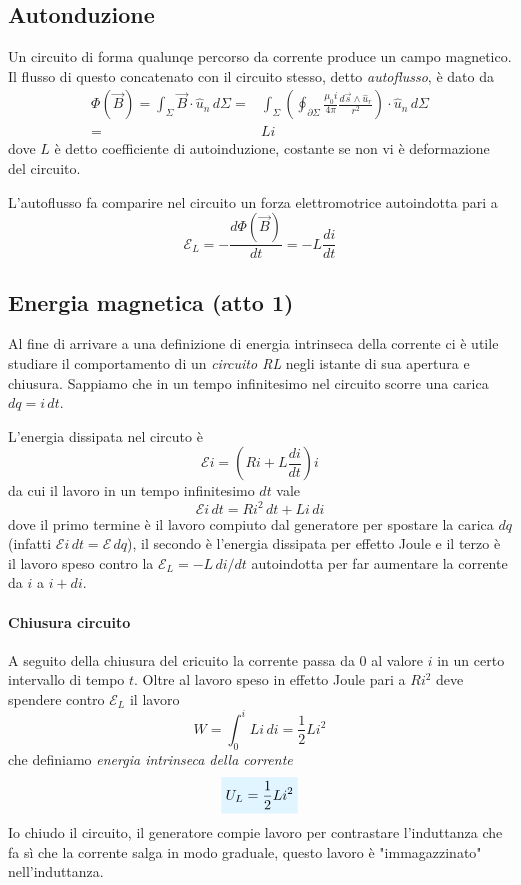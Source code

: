 \documentclass[x11names]{report}
\newcommand{\viola}[1]{%
	\colorbox{myblue}{$\displaystyle #1$}
}
\begin{document}
\subsection{Autonduzione}
Un circuito di forma qualunqe percorso da corrente produce un campo magnetico. Il flusso di questo concatenato con il circuito stesso, detto \textit{autoflusso}, è dato da 
\begin{align*}
	\Phi(\vec{B}) = \int_\Sigma \vec{B}\cdot \hat{u}_n \, d\Sigma =& \int_\Sigma \left(\oint_{\partial\Sigma} \frac{\mu_0 i}{4\pi}\frac{d\vec{s}\wedge\hat{u}_r}{r^2}\right) \cdot \hat{u}_n \, d\Sigma \\
	=& Li
\end{align*}
dove \(L\) è detto coefficiente di autoinduzione, costante se non vi è deformazione del circuito. 

L'autoflusso fa comparire nel circuito un forza elettromotrice autoindotta pari a 
\[
\mathcal{E}_L= - \frac{d\Phi(\vec{B})}{dt} = - L\frac{di}{dt}
\]

\subsection{Energia magnetica (atto 1)}
Al fine di arrivare a una definizione di energia intrinseca della corrente ci è utile studiare il comportamento di un \textit{circuito RL} negli istante di sua apertura e chiusura. Sappiamo che in un tempo infinitesimo nel circuito scorre una carica \(dq = i \, dt\).

L'energia dissipata nel circuto è
\[
\mathcal{E}i = \left(Ri + L\frac{di}{dt}\right)i
\]
da cui il lavoro in un tempo infinitesimo \(dt\) vale
\[
\mathcal{E}i \, dt = Ri^2 \, dt + Li \, di
\]
dove il primo termine è il lavoro compiuto dal generatore per spostare la carica \(dq\) (infatti \(\mathcal{E}i \, dt  = \mathcal{E} \, dq \)), il secondo è l'energia dissipata per effetto Joule e il terzo è il lavoro speso contro la \(\mathcal{E}_L = -L \, di/dt\) autoindotta per far aumentare la corrente da \(i\) a \(i + di\).

\paragraph{Chiusura circuito} A seguito della chiusura del cricuito la corrente passa da \(0\) al valore \(i\) in un certo intervallo di tempo \(t\). Oltre al lavoro speso in effetto Joule pari a \(Ri^2\) deve spendere contro \(\mathcal{E}_L\) il lavoro
\[
W = \int_{0}^{i}Li \, di = \frac{1}{2}Li^2
\]
che definiamo \textit{energia intrinseca della corrente}
\begin{equation}
	\viola{U_L = \frac{1}{2}Li^2}
\end{equation}
Io chiudo il circuito, il generatore compie lavoro per contrastare l'induttanza che fa sì che la corrente salga in modo graduale, questo lavoro è "immagazzinato" nell'induttanza.
\end{document}
